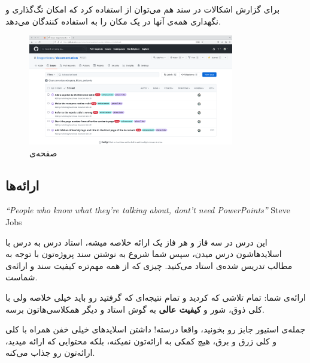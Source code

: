 برای گزارش اشکالات در سند هم می‌توان از  استفاده کرد که امکان تگ‌گذاری و نگهداری همه‌ی آنها در یک مکان را به استفاده کنندگان می‌دهد.
\begin{figure}[H]
	\caption{صفحه‌ی }
	\begin{center}
		\includegraphics[angle=90, width=0.8\textwidth, height=0.8\textheight]{./images/issues}
	\end{center}
\end{figure}

\subsection{ارائه‌ها}

\begin{latin}
	\begin{center}
		\textit{``People who know what they're talking about, dont't need PowerPoints''} Steve Jobs
	\end{center}
\end{latin}

این درس در سه فاز و هر فاز یک ارائه خلاصه میشه، استاد درس به درس با اسلاید‌هاشون درس میدن، سپس شما شروع به نوشتن سند پروژه‌تون با توجه به مطالب تدریس شده‌ی استاد می‌کنید. چیزی که از همه مهم‌تره کیفیت سند و ارائه‌ی شماست.

ارائه‌ی شما: تمام تلاشی که کردید و تمام نتیجه‌ای که گرفتید رو باید خیلی خلاصه ولی با کلی ذوق، شور و \textbf{کیفیت عالی} به گوش استاد و دیگر همکلاسی‌هاتون برسه.

جمله‌ی استیور جابز رو بخونید، واقعا درسته! داشتن اسلاید‌های خیلی خفن همراه با کلی  و کلی زرق و برق، هیچ کمکی به ارائه‌تون نمیکنه، بلکه محتوایی که ارائه میدید، ارائه‌تون رو جذاب می‌کنه.

